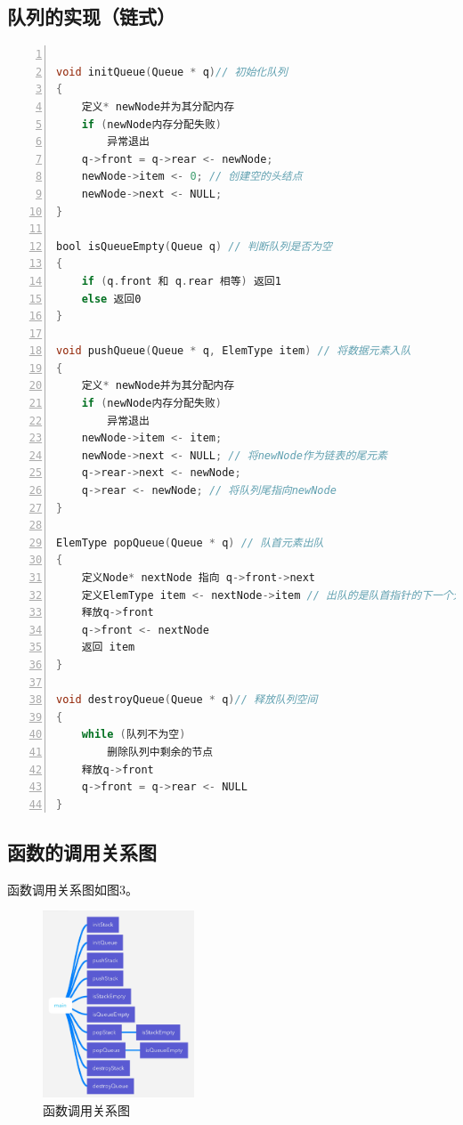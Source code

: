 \documentclass{article}
\begin{document}
\subsection{队列的实现（链式）}

\begin{lstlisting}[language={C},
    numbers=left,
    numberstyle=\tiny\consolas,
    basicstyle=\small\consolas]
    
void initQueue(Queue * q)// 初始化队列
{
    定义* newNode并为其分配内存
    if (newNode内存分配失败)
        异常退出
    q->front = q->rear <- newNode;
    newNode->item <- 0; // 创建空的头结点
    newNode->next <- NULL;
}

bool isQueueEmpty(Queue q) // 判断队列是否为空
{
    if (q.front 和 q.rear 相等) 返回1
    else 返回0
}

void pushQueue(Queue * q, ElemType item) // 将数据元素入队
{
    定义* newNode并为其分配内存
    if (newNode内存分配失败)
        异常退出
    newNode->item <- item;
    newNode->next <- NULL; // 将newNode作为链表的尾元素
    q->rear->next <- newNode;
    q->rear <- newNode; // 将队列尾指向newNode
}

ElemType popQueue(Queue * q) // 队首元素出队
{
    定义Node* nextNode 指向 q->front->next
    定义ElemType item <- nextNode->item // 出队的是队首指针的下一个元素
    释放q->front
    q->front <- nextNode
    返回 item
}

void destroyQueue(Queue * q)// 释放队列空间
{
    while (队列不为空) 
        删除队列中剩余的节点
    释放q->front
    q->front = q->rear <- NULL
}
\end{lstlisting}

\subsection{函数的调用关系图}

函数调用关系图如图3。

\begin{figure}[htbp]
    
    \centering\includegraphics[width=0.4\textwidth]{./Images/pic2_2_3.png}
    
    \caption{函数调用关系图}
    
\end{figure}
\end{document}
